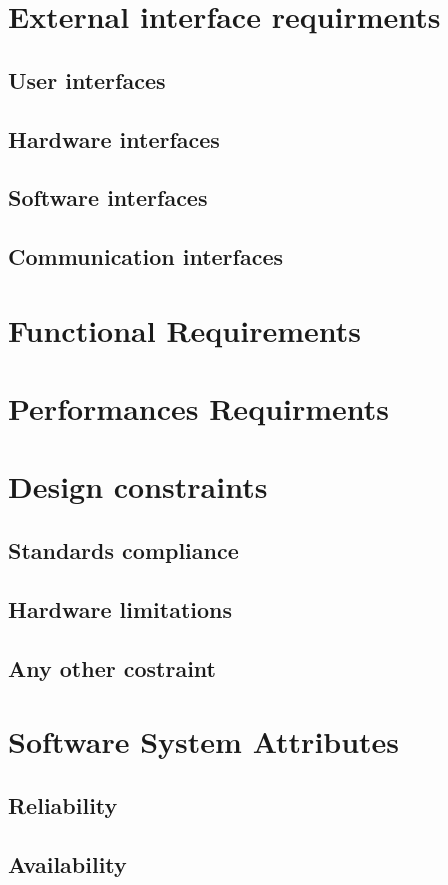 \documentclass[12pt,a4paper]{report}
\begin{document}
	\section{External interface requirments}
		\subsection{User interfaces}
		\subsection{Hardware interfaces}
		\subsection{Software interfaces}
		\subsection{Communication interfaces}
	\section{Functional Requirements}
	\section{Performances Requirments}
	\section{Design constraints}
		\subsection{Standards compliance}
		\subsection{Hardware limitations}
		\subsection{Any other costraint}
	\section{Software System Attributes}
		\subsection{Reliability}
		\subsection{Availability}
\end{document}
